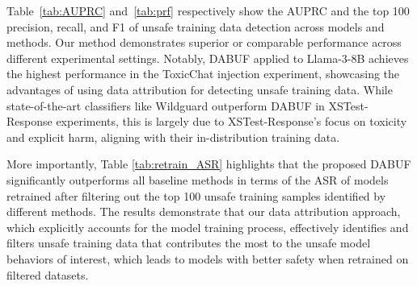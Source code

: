 \documentclass[11pt]{article}
\begin{document}
\begin{table}[ht]
\small
\centering
\caption{\textit{Attack Success Rate} (ASR) comparison between models retrained with the top 100 unsafe training samples filtered by baseline methods and DABUF. A higher ASR reflects a more unsafe model.}
\label{tab:retrain_ASR}
\end{table}



Table~\ref{tab:AUPRC} and~\ref{tab:prf} respectively show the AUPRC and the top 100 precision, recall, and F1 of unsafe training data detection across models and methods. Our method demonstrates superior or comparable performance across different experimental settings. Notably, DABUF applied to Llama-3-8B achieves the highest performance in the ToxicChat injection experiment, showcasing the advantages of using data attribution for detecting unsafe training data. While state-of-the-art classifiers like Wildguard outperform DABUF in XSTest-Response experiments, this is largely due to XSTest-Response's focus on toxicity and explicit harm, aligning with their in-distribution training data. 

More importantly, Table \ref{tab:retrain_ASR} highlights that the proposed DABUF significantly outperforms all baseline methods in terms of the ASR of models retrained after filtering out the top 100 unsafe training samples identified by different methods. The results demonstrate that our data attribution approach, which explicitly accounts for the model training process, effectively identifies and filters unsafe training data that contributes the most to the unsafe model behaviors of interest, which leads to models with better safety when retrained on filtered datasets. 
\end{document}
